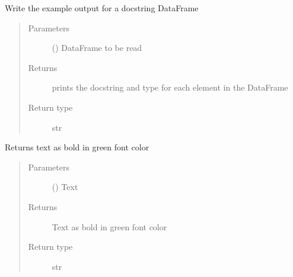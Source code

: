 \documentclass[letterpaper,10pt,english]{sphinxmanual}
\begin{document}

\begin{fulllineitems}
\label{\detokenize{openfdem:openfdem.formatting_codes.docstring_creator}}
Write the example output for a docstring DataFrame
\begin{quote}\begin{description}
\item[{Parameters}] \leavevmode
{} () \textendash{} DataFrame to be read

\item[{Returns}] \leavevmode
prints the docstring and type for each element in the DataFrame

\item[{Return type}] \leavevmode
str

\end{description}\end{quote}

\end{fulllineitems}


\begin{fulllineitems}
\label{\detokenize{openfdem:openfdem.formatting_codes.green_text}}
Returns text as bold in green font color
\begin{quote}\begin{description}
\item[{Parameters}] \leavevmode
{} () \textendash{} Text

\item[{Returns}] \leavevmode
Text as bold in green font color

\item[{Return type}] \leavevmode
str

\end{description}\end{quote}

\end{fulllineitems}
\end{document}
